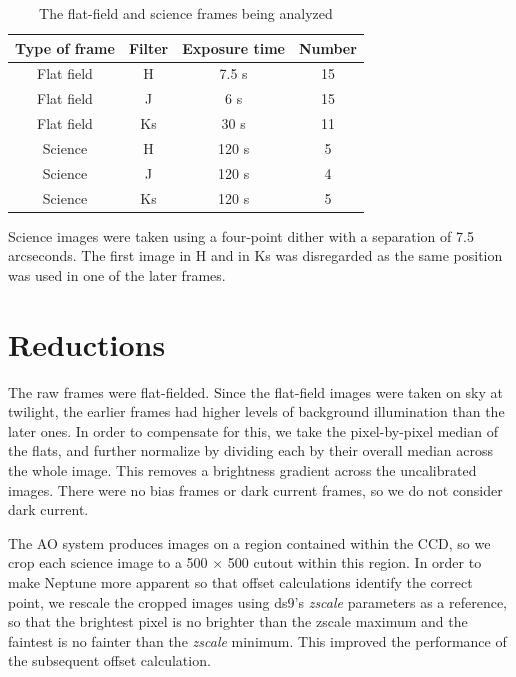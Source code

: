 \documentclass{article}
\begin{document}
    \begin{table}
        \centering
        \begin{tabular}{|c|c|c|c|}
            \hline
            \textbf{Type of frame} & \textbf{Filter} & \textbf{Exposure time} & \textbf{Number}\\
            \hline
            Flat field & H & 7.5 s & 15\\
            Flat field & J & 6 s & 15\\
            Flat field & Ks & 30 s &  11\\
            Science & H & 120 s & 5\\
            Science & J & 120 s & 4\\
            Science & Ks & 120 s & 5\\\hline
        \end{tabular}
        \caption{The flat-field and science frames being analyzed}
        \label{tab:frames}
    \end{table}

    Science images were taken using a four-point dither with a separation of 7.5 arcseconds. The first image in H and in Ks was disregarded as the same position was used in one of the later frames.

    \section{Reductions}

    The raw frames were flat-fielded. Since the flat-field images were taken on sky at twilight, the earlier frames had higher levels of background illumination than the later ones. In order to compensate for this, we take the pixel-by-pixel median of the flats, and further normalize by dividing each by their overall median across the whole image. This removes a brightness gradient across the uncalibrated images. There were no bias frames or dark current frames, so we do not consider dark current. 

    The AO system produces images on a region contained within the CCD, so we crop each science image to a 500 $\times$ 500 cutout within this region. In order to make Neptune more apparent so that offset calculations identify the correct point, we rescale the cropped images using ds9's \textit{zscale} parameters as a reference, so that the brightest pixel is no brighter than the zscale maximum and the faintest is no fainter than the \textit{zscale} minimum. This improved the performance of the subsequent offset calculation.
\end{document}
